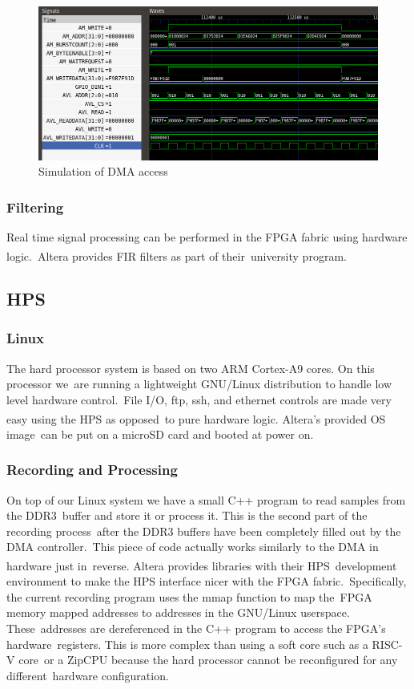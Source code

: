 \documentclass{article}
\begin{document}
\begin{figure}[ht]
	\begin{center}
	\includegraphics[scale=.4]{pictures/sim_close.png}
	\caption{Simulation of DMA access}
	\label{dma_sim}
	\end{center}
\end{figure}

\subsubsection{Filtering}
Real time signal processing can be performed in the FPGA fabric using hardware logic.\
Altera\textsuperscript{\textregistered{}} provides FIR filters as part of their\
university program.  

\subsection{HPS}

\subsubsection{Linux}
The hard processor system is based on two ARM Cortex-A9 cores.  On this processor we\ are running a lightweight GNU/Linux distribution to handle low level hardware control.\
File I/O, ftp, ssh, and ethernet controls are made very easy using the HPS as opposed\
to pure hardware logic. Altera\textsuperscript{\textregistered{}}'s provided OS image\
can be put on a microSD card and booted at power on.

\subsubsection{Recording and Processing}
On top of our Linux system we have a small C++ program to read samples from the DDR3\
buffer and store it or process it.  This is the second part of the recording process\
after the DDR3 buffers have been completely filled out by the DMA controller.\
This piece of code actually works similarly to the DMA in hardware just in\
reverse. Altera\textsuperscript{\textregistered{}} provides libraries with their HPS\
development environment to make the HPS interface nicer with the FPGA fabric.\
Specifically, the current recording program uses the mmap function to map the\
FPGA memory mapped addresses to addresses in the GNU/Linux userspace. These\
addresses are dereferenced in the C++ program to access the FPGA's hardware\
registers. This is more complex than using a soft core such as a RISC-V core\
or a ZipCPU because the hard processor cannot be reconfigured for any different\
hardware configuration.
\end{document}
